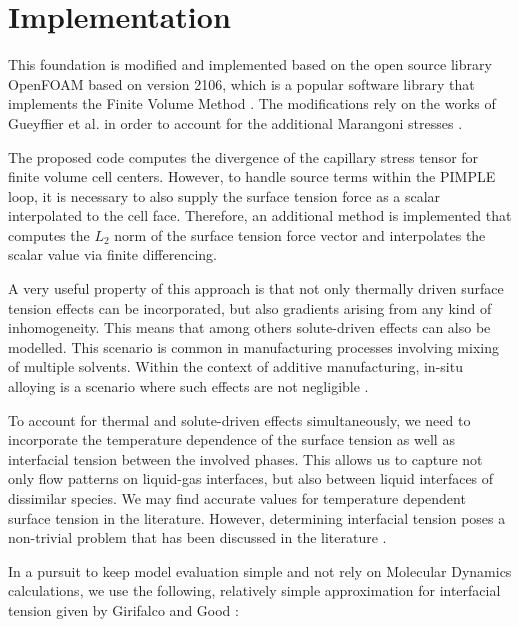 \documentclass[conference,final,a4paper]{IEEEtran}
\begin{document}

\section{Implementation}

This foundation is modified and implemented based on the open source library OpenFOAM based on version 2106, which is a popular software library that implements the Finite Volume Method \cite{jasakOpenFOAMLibraryComplex2007}. The modifications rely on the works of Gueyffier et al. in order to account for the additional Marangoni stresses \cite{gueyffierVolumeofFluidInterfaceTracking1999}.

The proposed code computes the divergence of the capillary stress tensor for finite volume cell centers. However, to handle source terms within the PIMPLE loop, it is necessary to also supply the surface tension force as a scalar interpolated to the cell face. Therefore, an additional method is implemented that computes the $L_2$ norm of the surface tension force vector and interpolates the scalar value via finite differencing.

A very useful property of this approach is that not only thermally driven surface tension effects can be incorporated, but also gradients arising from any kind of inhomogeneity. This means that among others solute-driven effects can also be modelled. This scenario is common in manufacturing processes involving mixing of multiple solvents. Within the context of additive manufacturing, in-situ alloying is a scenario where such effects are not negligible \cite{katz-demyanetzInsituAlloyingNovel2020}.

To account for thermal and solute-driven effects simultaneously, we need to incorporate the temperature dependence of the surface tension as well as interfacial tension between the involved phases. This allows us to capture not only flow patterns on liquid-gas interfaces, but also between liquid interfaces of dissimilar species. We may find accurate values for temperature dependent surface tension in the literature. However, determining interfacial tension poses a non-trivial problem that has been discussed in the literature \cite{marmurCorrelatingInterfacialTensions2010}.

In a pursuit to keep model evaluation simple and not rely on Molecular Dynamics calculations, we use the following, relatively simple approximation for interfacial tension given by Girifalco and Good \cite{girifalcoTheoryEstimationSurface1957}:
\end{document}
